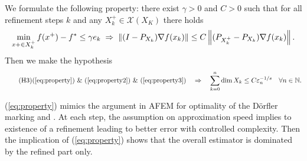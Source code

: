 \documentclass[12pt,english]{article}
\begin{document}
We formulate the following property: there exist $\gamma>0$ and $C>0$ such that for 
all refinement steps $k$ and any $X_k^+\in \mathcal X(X_K)$ there holds
%
\begin{equation}\label{eq:property}
\min_{x+\in X_k^+} f(x^+)-f^* \le \gamma e_k
\;\Rightarrow\; \left\|(I-P_{X_k})\nabla f(x_k)\right\|\le C \left\|(P_{X_k^+}-P_{X_k})\nabla f(x_k)\right\|.
\end{equation}
%
Then we make the hypothesis
%
\begin{align}
\label{hyp:estimator:optimality}\tag{H3}
\mbox{(\ref{eq:property}) \& (\ref{eq:property2}) \& (\ref{eq:property3})}
\quad\Rightarrow\quad \sum_{k=0}^n \dim X_k \le C \eps_n^{-1/s}\quad \forall n\in\N.
%
\end{align}
%
\begin{remark}\label{rmk:}
(\ref{eq:property}) mimics the argument in AFEM for optimality of the Dörfler marking \cite{Stevenson05b} and 
\cite{GantnerHaberlPraetorius21}. At each step, the assumption on approximation speed implies to existence of a refinement leading to better error with controlled complexity. 
Then the implication of (\ref{eq:property}) shows that the overall estimator is dominated by the refined part only.
\end{remark}
%
\end{document}
